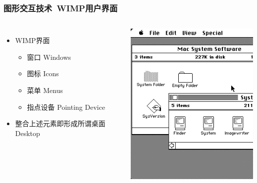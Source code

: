 \documentclass{beamer}
\begin{document}
\begin{frame}
	\frametitle{图形交互技术~{\small WIMP用户界面}}
	\begin{columns}
	\begin{itemize}
		\item WIMP界面~\cite{hinckley1996haptic, hinckley2007input}
		\begin{itemize}
			\item 窗口 Windows
			\item 图标 Icons
			\item 菜单 Menus
			\item 指点设备 Pointing Device
		\end{itemize}
		\item 整合上述元素即形成所谓桌面 Desktop
	\end{itemize}
	\includegraphics[width=\textwidth]{images/apple-lisa.png}
	\end{columns}
\end{frame}
\end{document}
